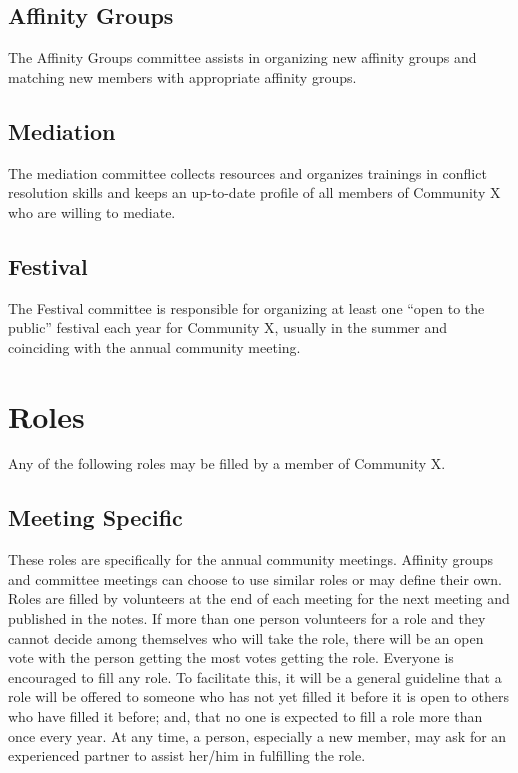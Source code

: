 \subsection*{Affinity Groups}
The Affinity Groups committee assists in organizing new affinity groups and matching new members with appropriate affinity groups.


\subsection*{Mediation}
The mediation committee collects resources and organizes trainings in conflict resolution skills and keeps an up-to-date profile of all members of Community X who are willing to mediate.


\subsection*{Festival}
The Festival committee is responsible for organizing at least one ``open to the public'' festival each year for Community X, usually in the summer and coinciding with the annual community meeting.


\section*{Roles}
Any of the following roles may be filled by a member of Community X.


\subsection*{Meeting Specific}
These roles are specifically for the annual community meetings. Affinity groups and committee meetings can choose to use similar roles or may define their own. Roles are filled by volunteers at the end of each meeting for the next meeting and published in the notes. If more than one person volunteers for a role and they cannot decide among themselves who will take the role, there will be an open vote with the person getting the most votes getting the role. Everyone is encouraged to fill any role. To facilitate this, it will be a general guideline that a role will be offered to someone who has not yet filled it before it is open to others who have filled it before; and, that no one is expected to fill a role more than once every year. At any time, a person, especially a new member, may ask for an experienced partner to assist her/him in fulfilling the role.



